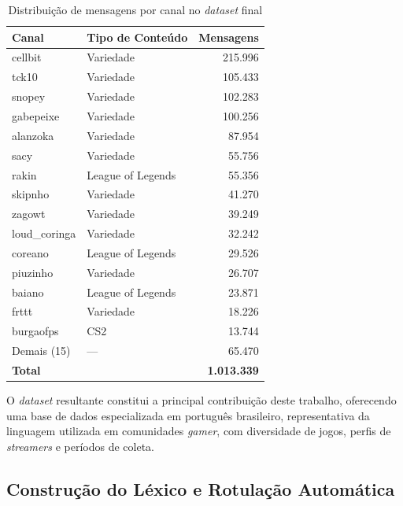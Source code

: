 \documentclass{eic-bcc-tcc}
\begin{document}
\begin{table}[h!]
\centering
\small
\begin{tabular}{llr}
\hline
\textbf{Canal} & \textbf{Tipo de Conteúdo} & \textbf{Mensagens} \\ \hline
cellbit          & Variedade         & 215.996 \\
tck10            & Variedade         & 105.433 \\
snopey           & Variedade         & 102.283 \\
gabepeixe        & Variedade         & 100.256 \\
alanzoka         & Variedade         &  87.954 \\
sacy             & Variedade         &  55.756 \\
rakin            & League of Legends &  55.356 \\
skipnho          & Variedade         &  41.270 \\
zagowt           & Variedade         &  39.249 \\
loud\_coringa    & Variedade         &  32.242 \\
coreano          & League of Legends &  29.526 \\
piuzinho         & Variedade         &  26.707 \\
baiano           & League of Legends &  23.871 \\
frttt            & Variedade         &  18.226 \\
burgaofps        & CS2               &  13.744 \\
Demais (15)      & ---                &  65.470 \\ \hline
\textbf{Total}   &                   & \textbf{1.013.339} \\ \hline
\end{tabular}
\caption{Distribuição de mensagens por canal no \textit{dataset} final}
\label{tab:streamers}
\end{table}

O \textit{dataset} resultante constitui a principal contribuição deste trabalho, oferecendo uma base de dados especializada em português brasileiro, representativa da linguagem utilizada em comunidades \textit{gamer}, com diversidade de jogos, perfis de \textit{streamers} e períodos de coleta.

\subsection{Construção do Léxico e Rotulação Automática}
\label{sec:lexico}
\end{document}
